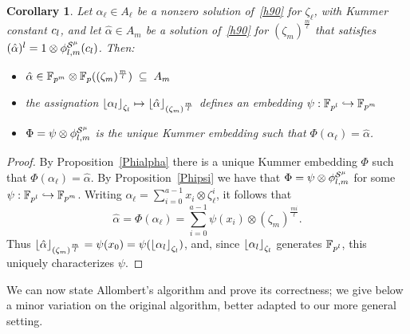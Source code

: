 \documentclass{sig-alternate}
\newtheorem{corollary}[theorem]{Corollary}
\begin{document}
\begin{corollary}
\label{alphapsi}
Let $\alpha_\ell\in A_\ell$ be a nonzero solution of~\eqref{h90} for $\zeta_\ell$,
with Kummer constant $c_l$, and
let $\hat{\alpha}\in A_m$ be a solution of~\eqref{h90} for $(\zeta_m)^{\frac{m}{\ell}}$
that satisfies $(\hat{\alpha})^l=1\otimes{\phi^{\mathcal{S}^\mu}_{{l},{m}}}(c_l)$.
Then:
\begin{itemize}
\item $\hat{\alpha}\in\mathbb{F}_{p^m}\otimes\mathbb{F}_{p}((\zeta_m)^{\frac{m}{l}})\;\subseteq\;A_m$
\item the assignation $\left\lfloor \alpha_{l} \right\rfloor_{\zeta_l}\mapsto\left\lfloor \hat{\alpha} \right\rfloor_{(\zeta_m)^{\frac{m}{l}}}$
defines an embedding $\psi:\mathbb{F}_{p^l}\hookrightarrow\mathbb{F}_{p^m}$
\item $\Phi=\psi\otimes{\phi^{\mathcal{S}^\mu}_{{l},{m}}}$ is the unique Kummer embedding such that $\Phi(\alpha_\ell)=\hat{\alpha}$.
\end{itemize}
\end{corollary}
\begin{proof}
By Proposition~\ref{Phialpha} there is a unique Kummer embedding $\Phi$ such that $\Phi(\alpha_\ell)=\hat{\alpha}$.
By Proposition~\ref{Phipsi} we have that $\Phi=\psi\otimes{\phi^{\mathcal{S}^\mu}_{{l},{m}}}$ for some $\psi:\mathbb{F}_{p^l}\hookrightarrow\mathbb{F}_{p^m}$.
Writing $\alpha_\ell=\sum_{i=0}^{a-1}x_i\otimes\zeta_{\ell}^i$,
it follows that \[ \hat{\alpha}=\Phi(\alpha_\ell)=\sum_{i=0}^{a-1}\psi(x_i)\otimes(\zeta_m)^{\frac{mi}{\ell}}. \]
Thus $\left\lfloor \hat{\alpha} \right\rfloor_{(\zeta_m)^{\frac{m}{l}}}=\psi(x_0)=\psi(\left\lfloor \alpha_{l} \right\rfloor_{\zeta_l})$,
and, since $\left\lfloor \alpha_{l} \right\rfloor_{\zeta_l}$ generates $\mathbb{F}_{p^l}$, this uniquely characterizes $\psi$.
\end{proof}

We can now state Allombert's algorithm and prove its correctness; we
give below a minor variation on the original algorithm, better adapted
to our more general setting.
\end{document}
